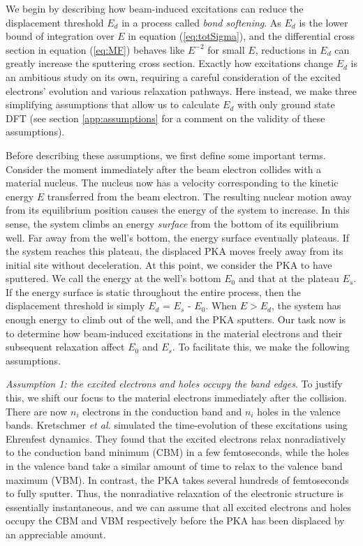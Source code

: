 \documentclass{article}
\begin{document}
We begin by describing how beam-induced excitations can reduce the
displacement threshold $E_d$ in a process called \textit{bond softening}.
As $E_d$ is the lower bound of integration over $E$ in equation
(\ref{eq:totSigma}), and the differential cross section in equation
(\ref{eq:MF}) behaves like $E^{-2}$ for small $E$, reductions in $E_d$ can
greatly increase the sputtering cross section.
Exactly how excitations change $E_d$ is an ambitious study on its own,
requiring a careful consideration of the excited electrons' evolution and
various relaxation pathways.\cite{Lingerfelt2019a}
Here instead, we make three simplifying assumptions that allow us to calculate
$E_d$ with only ground state DFT (see section \ref{app:assumptions} for a
comment on the validity of these assumptions).

Before describing these assumptions, we first define some important terms.
Consider the moment immediately after the beam electron collides with a
material nucleus.
The nucleus now has a velocity corresponding to the kinetic energy
$E$ transferred from the beam electron.
The resulting nuclear motion away from its equilibrium position causes the
energy of the system to increase.
In this sense, the system climbs an energy \textit{surface} from the bottom of its
equilibrium well.
Far away from the well's bottom, the energy surface eventually plateaus.
If the system reaches this plateau, the displaced PKA moves
freely away from its initial site without deceleration. At this point, we
consider the PKA to have sputtered. We call the energy at the well's bottom
$E_0$ and that at the plateau $E_s$.
If the energy surface is static throughout the entire process, then the
displacement threshold is simply $E_d$ = $E_s$ - $E_0$.
When $E>E_d$, the system has enough energy to climb out of the well,
and the PKA sputters.  Our task now is to determine how beam-induced
excitations in the material electrons and their subsequent relaxation affect
$E_0$ and $E_s$.  To facilitate this, we make the following assumptions.

\medskip\noindent
\textit{Assumption 1: the excited electrons and holes occupy the band edges}.
To justify this, we shift our focus to the material electrons immediately after
the collision.  There are now $n_i$ electrons in the conduction band and $n_i$
holes in the valence bands.  Kretschmer \textit{et al.} simulated the time-evolution of
these excitations using Ehrenfest dynamics.\cite{Kretschmer2020,Li2005}
They found that the excited electrons relax nonradiatively to the conduction
band minimum (CBM) in a few femtoseconds, while the holes in the valence band
take a similar amount of time to relax to the valence band maximum (VBM).
In contrast, the PKA takes several hundreds of femtoseconds to fully sputter.
\cite{Yoshimura2018}
Thus, the nonradiative relaxation of the electronic structure is essentially
instantaneous, and we can assume that all excited electrons and holes occupy
the CBM and VBM respectively before the PKA has been displaced by an
appreciable amount.
\end{document}
